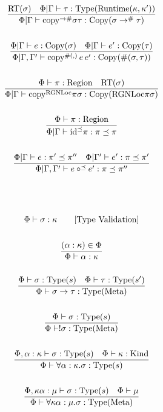 \documentclass {article}
\begin{document}
\begin{gather*}
\\
\frac
{\text{RT} (\sigma) \quad \Phi | \Gamma \vdash \tau : \text{Type}(\text{Runtime}(\kappa, \kappa'))}
{\Phi | \Gamma \vdash \text{copy}^{\to\#} \sigma \tau : \text{Copy} (\sigma \to^\# \tau)} \\
\\
\frac
{\Phi | \Gamma \vdash e : \text{Copy} (\sigma) \quad \Phi | \Gamma \vdash e' : \text{Copy} (\tau)}
{\Phi | \Gamma, \Gamma' \vdash \text{copy}^{\#(,)} \, e \, e' : \text{Copy} (\#(\sigma, \tau))} \\
\\
\frac
{\Phi \vdash \pi : \text{Region} \quad \text{RT} (\sigma)}
{\Phi | \Gamma \vdash \text{copy}^\text{RGNLoc} \pi \sigma : \text{Copy} (\text{RGNLoc} \pi \sigma)} \\
\\
\frac
{\Phi \vdash \pi : \text{Region}}
{\Phi | \Gamma \vdash \text{id}^{\preceq} \pi : \pi \preceq \pi} \\
\\
\frac
{\Phi | \Gamma \vdash e : \pi' \preceq \pi'' \quad \Phi | \Gamma' \vdash e' : \pi \preceq \pi'}
{\Phi | \Gamma, \Gamma' \vdash e \circ^\preceq e' : \pi \preceq \pi''} \\
\\
\\
\\
\Phi \vdash \sigma : \kappa \tag* {[\text{Type Validation}]} \\
\\
\frac
{(\alpha : \kappa) \in \Phi}
{\Phi \vdash \alpha : \kappa} \\
\\
\frac
{\Phi \vdash \sigma : \text{Type} (s) \quad \Phi \vdash \tau : \text{Type} (s')}
{\Phi \vdash \sigma \to \tau : \text{Type} (\text{Meta})} \\
\\
\frac
{\Phi \vdash \sigma : \text{Type} (s)}
{\Phi \vdash !\sigma : \text{Type} (\text{Meta})} \\
\\
\frac
{\Phi, \alpha : \kappa \vdash \sigma : \text{Type}(s) \quad \Phi \vdash \kappa : \text{Kind}}
{\Phi \vdash \forall \alpha : \kappa. \sigma : \text{Type} (s) } \\
\\
\frac
{\Phi, \kappa \alpha : \mu \vdash \sigma : \text{Type} (s) \quad \Phi \vdash \mu  }
{\Phi \vdash \forall \kappa \alpha : \mu. \sigma : \text{Type} (\text{Meta}) } \\
\\

\end{gather*}
\end{document}
